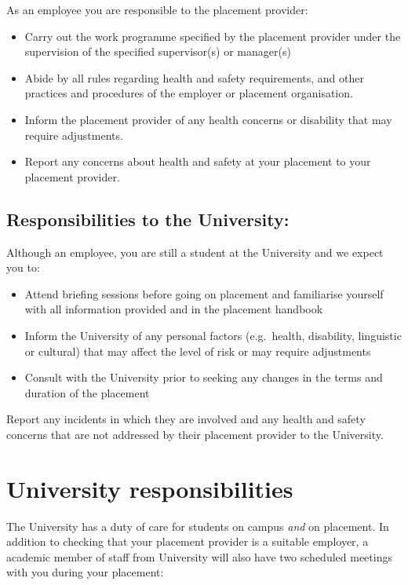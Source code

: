 \documentclass[
]{book}
\providecommand{\tightlist}{%
  \setlength{\itemsep}{0pt}\setlength{\parskip}{0pt}}
\begin{document}
As an employee you are responsible to the placement provider:

\begin{itemize}
\tightlist
\item
  Carry out the work programme specified by the placement provider under the supervision of the specified supervisor(s) or manager(s)
\item
  Abide by all rules regarding health and safety requirements, and other practices and procedures of the employer or placement organisation.
\item
  Inform the placement provider of any health concerns or disability that may require adjustments.
\item
  Report any concerns about health and safety at your placement to your placement provider.
\end{itemize}

\section{Responsibilities to the University:}\label{responsibilities-to-the-university}

Although an employee, you are still a student at the University and we expect you to:

\begin{itemize}
\tightlist
\item
  Attend briefing sessions before going on placement and familiarise yourself with all information provided and in the placement handbook
\item
  Inform the University of any personal factors (e.g.~health, disability, linguistic or cultural) that may affect the level of risk or may require adjustments
\item
  Consult with the University prior to seeking any changes in the terms and duration of the placement
\end{itemize}

Report any incidents in which they are involved and any health and safety concerns that are not addressed by their placement provider to the University.

\chapter{University responsibilities}\label{university}

The University has a duty of care for students on campus \emph{and} on placement. In addition to checking that your placement provider is a suitable employer, a academic member of staff from University will also have two scheduled meetings with you during your placement:
\end{document}
